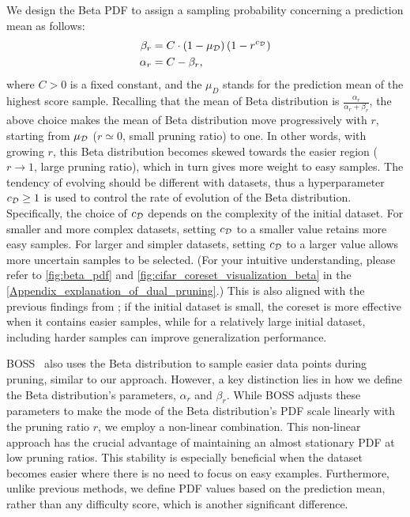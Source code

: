 We design the Beta PDF to assign a sampling probability concerning a prediction mean as follows:
\begin{align}
\label{eq:alpha_beta}
\begin{split}
    \beta_r &= C \cdot (1-\mu_{\mathcal{D}})  \left(1-r^{c_{\mathcal{D}}}\right)\\
    \alpha_r &= C-\beta_r, \\
\end{split}
\end{align}
where $C > 0$ is a fixed constant, and the $\mu_D$ stands for the prediction mean of the highest score sample.
Recalling that the mean of Beta distribution is $\frac{\alpha_r}{\alpha_r + \beta_r}$, the above choice makes the mean of Beta distribution move progressively with $r$, starting from $\mu_{\mathcal{D}}$ ($r \simeq 0$, small pruning ratio) to one. In other words, with growing $r$, this Beta distribution becomes skewed towards the easier region ($r \rightarrow 1$, large pruning ratio), which in turn gives more weight to easy samples. 
The tendency of evolving should be different with datasets, thus a hyperparameter $c_{\mathcal{D}} \geq 1$ is used to control the rate of evolution of the Beta distribution. Specifically, the choice of \( c_{\mathcal{D}} \) depends on the complexity of the initial dataset. For smaller and more complex datasets, setting \( c_{\mathcal{D}} \) to a smaller value retains more easy samples. For larger and simpler datasets, setting \( c_{\mathcal{D}} \) to a larger value allows more uncertain samples to be selected.
(For your intuitive understanding, please refer to  \cref{fig:beta_pdf} and \cref{fig:cifar_coreset_visualization_beta} in the \cref{Appendix_explanation_of_dual_pruning}.) This is also aligned with the previous findings from \citet{sorscher2022beyond}; if the initial dataset is small, the coreset is more effective when it contains easier samples, while for a relatively large initial dataset, including harder samples can improve generalization performance.


\begin{remark}
BOSS~\citep{acharyabalancing} also uses the Beta distribution to sample easier data points during pruning, similar to our approach. However, a key distinction lies in how we define the Beta distribution's parameters, \(\alpha_r\) and \(\beta_r\). While BOSS adjusts these parameters to make the mode of the Beta distribution's PDF scale linearly with the pruning ratio $r$, we employ a non-linear combination. This non-linear approach has the crucial advantage of maintaining an almost stationary PDF at low pruning ratios. This stability is especially beneficial when the dataset becomes easier where there is no need to focus on easy examples. Furthermore, unlike previous methods, we define PDF values based on the prediction mean, rather than any difficulty score, which is another significant difference.
\end{remark}
